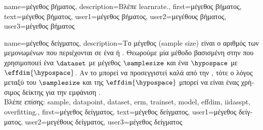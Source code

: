 {name={\foreignlanguage{greek}{μέγεθος βήματος}}, 
	description={\foreignlanguage{greek}{Βλέπε} \gls{learnrate}.}, 
	first={\foreignlanguage{greek}{μέγεθος βήματος}},
	text={\foreignlanguage{greek}{μέγεθος βήματος}},
	user1={\foreignlanguage{greek}{μέγεθος βήματος}}, %
  	user2={\foreignlanguage{greek}{μεγέθους βήματος}}, %
	user3={\foreignlanguage{greek}{μέγεθος βήματος}} %
}

{name={\foreignlanguage{greek}{μέγεθος δείγματος}},
	description={\foreignlanguage{greek}{Το μέγεθος}  (sample size) 
		\foreignlanguage{greek}{είναι ο αριθμός των μεμονωμένων}  \foreignlanguage{greek}{που περιέχονται σε ένα}  
	    	 \foreignlanguage{greek}{ή} . \foreignlanguage{greek}{Θεωρούμε μία μέθοδο βασισμένη 
		στην}  \foreignlanguage{greek}{που χρησιμοποιεί ένα}  $\dataset$ 
		\foreignlanguage{greek}{με μέγεθος}  $\samplesize$ \foreignlanguage{greek}{και ένα}
		 $\hypospace$ \foreignlanguage{greek}{με}  $\effdim{\hypospace}$. 
		\foreignlanguage{greek}{Αν το}  \foreignlanguage{greek}{μπορεί να προσεγγιστεί καλά από την} 
		, \foreignlanguage{greek}{τότε ο λόγος μεταξύ του $\samplesize$ και της $\effdim{\hypospace}$ 
		μπορεί να είναι ένας χρήσιμος δείκτης για την εμφάνιση}  \cite[\foreignlanguage{greek}{Κεφ.} 6]{MLBasics}.
		\\
		\foreignlanguage{greek}{Βλέπε επίσης:} \gls{sample}, \gls{datapoint}, \gls{dataset}, \gls{erm}, \gls{trainset}, \gls{model}, \gls{effdim},
		\gls{iidasspt}, \gls{overfitting}.},
	first={\foreignlanguage{greek}{μέγεθος δείγματος}},
	text={\foreignlanguage{greek}{μέγεθος δείγματος}},
	user1={\foreignlanguage{greek}{μέγεθος δείγματος}}, %
	user2={\foreignlanguage{greek}{μεγέθους δείγματος}}, %
	user3={\foreignlanguage{greek}{μέγεθος δείγματος}} %
}

